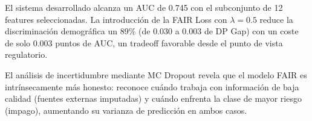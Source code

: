 \documentclass[12pt,a4paper]{article}
\begin{document}
El sistema desarrollado alcanza un AUC de 0.745 con el subconjunto de 12
features seleccionadas. La introducción de la FAIR Loss con $\lambda=0.5$
reduce la discriminación demográfica un 89\% (de 0.030 a 0.003 de DP Gap)
con un coste de solo 0.003 puntos de AUC, un tradeoff favorable desde el
punto de vista regulatorio.

El análisis de incertidumbre mediante MC Dropout revela que el modelo FAIR
es intrínsecamente más honesto: reconoce cuándo trabaja con información de
baja calidad (fuentes externas imputadas) y cuándo enfrenta la clase de
mayor riesgo (impago), aumentando su varianza de predicción en ambos casos.
\end{document}
